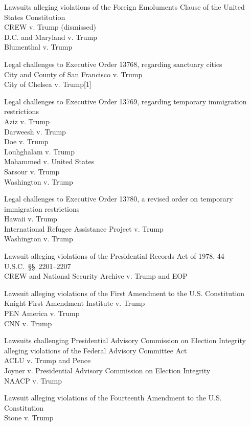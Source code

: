 Lawsuits alleging violations of the Foreign Emoluments Clause of the
United States Constitution\\
CREW v. Trump (dismissed)\\
D.C. and Maryland v. Trump\\
Blumenthal v. Trump

Legal challenges to Executive Order 13768, regarding sanctuary cities\\
City and County of San Francisco v. Trump\\
City of Chelsea v. Trump{[}1{]}

Legal challenges to Executive Order 13769, regarding temporary
immigration restrictions\\
Aziz v. Trump\\
Darweesh v. Trump\\
Doe v. Trump\\
Louhghalam v. Trump\\
Mohammed v. United States\\
Sarsour v. Trump\\
Washington v. Trump

Legal challenges to Executive Order 13780, a revised order on temporary
immigration restrictions\\
Hawaii v. Trump\\
International Refugee Assistance Project v. Trump\\
Washington v. Trump

Lawsuit alleging violations of the Presidential Records Act of 1978, 44
U.S.C.~§§~2201--2207\\
CREW and National Security Archive v. Trump and EOP

Lawsuit alleging violations of the First Amendment to the U.S.
Constitution\\
Knight First Amendment Institute v. Trump\\
PEN America v. Trump\\
CNN v. Trump

Lawsuits challenging Presidential Advisory Commission on Election
Integrity alleging violations of the Federal Advisory Committee Act\\
ACLU v. Trump and Pence\\
Joyner v. Presidential Advisory Commission on Election Integrity\\
NAACP v. Trump

Lawsuit alleging violations of the Fourteenth Amendment to the U.S.
Constitution\\
Stone v. Trump

